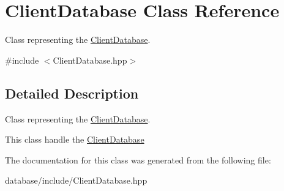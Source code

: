 \hypertarget{class_client_database}{}\section{Client\+Database Class Reference}
\label{class_client_database}


Class representing the \hyperlink{class_client_database}{Client\+Database}.  




{\ttfamily \#include $<$Client\+Database.\+hpp$>$}



\subsection{Detailed Description}
Class representing the \hyperlink{class_client_database}{Client\+Database}. 

This class handle the \hyperlink{class_client_database}{Client\+Database} 

The documentation for this class was generated from the following file\+:\begin{DoxyCompactItemize}
\item 
database/include/Client\+Database.\+hpp\end{DoxyCompactItemize}
